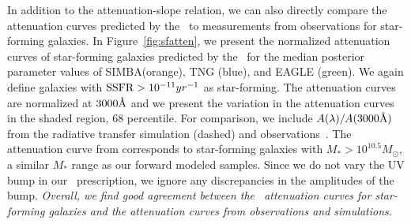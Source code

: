 In addition to the attenuation-slope relation, we can also directly compare
the attenuation curves predicted by the \eda~to measurements from
observations for star-forming galaxies. 
In Figure~\ref{fig:sfatten}, we present the normalized attenuation curves
of star-forming galaxies predicted by the \eda~for the median posterior
parameter values of SIMBA(orange), TNG (blue), and EAGLE (green).
We again define galaxies with ${\rm SSFR} > 10^{-11}{yr}^{-1}$ as star-forming.
The attenuation curves are normalized at $3000\AA$ and we present the
variation in the attenuation curves in the shaded region, 68 percentile. 
For comparison, we include $A(\lambda)/A(3000\AA)$ from the
\cite{narayanan2018} radiative transfer simulation (dashed) and 
observations~\citep[][dotted]{salim2018}. 
The attenuation curve from \cite{salim2018} corresponds to star-forming
galaxies with $M_* > 10^{10.5}M_\odot$, a similar $M_*$ range as our
forward modeled samples. 
Since we do not vary the UV bump in our \eda~prescription, we ignore any
discrepancies in the amplitudes of the bump. 
\emph{Overall, we find good agreement between the \eda~attenuation curves for
star-forming galaxies and the attenuation curves from observations and
simulations.}







